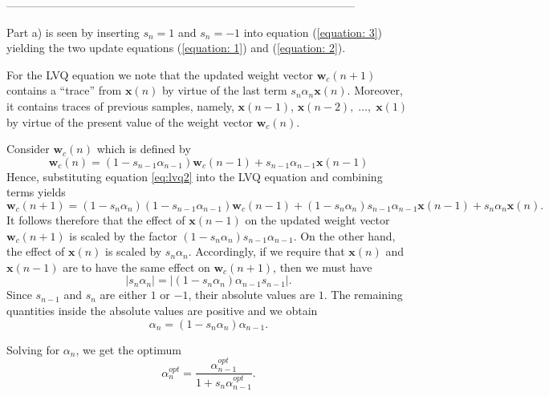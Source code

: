 \documentclass[10pt]{article}
\begin{document}
\begin{enumerate}
---------------------------------------------------------------------------------------------

Part a) is seen by inserting $s_n=1$ and $s_n=-1$ into equation (\ref{equation: 3}) yielding the two
update equations (\ref{equation: 1}) and (\ref{equation: 2}).

For the LVQ equation we note that the updated weight vector
$\mathbf{w}_c(n+1)$ contains a ``trace'' from  $\mathbf{x}(n)$ by
virtue of the last term $s_n\alpha_n\mathbf{x}(n)$. Moreover, it
contains traces of previous samples, namely, $\mathbf{x}(n-1)$,
$\mathbf{x}(n-2),\;\ldots,\; \mathbf{x}(1)$ by virtue of the present
value of the weight vector $\mathbf{w}_c(n)$.

Consider $\mathbf{w}_c(n)$ which is defined by
\begin{equation}
\mathbf{w}_c(n)=(1-s_{n-1}\alpha_{n-1})\mathbf{w}_c(n-1)+s_{n-1}\alpha_{n-1}\mathbf{x}(n-1)
\label{eq:lvq2}
\end{equation}
Hence, substituting equation \ref{eq:lvq2} into the LVQ equation and
combining terms yields
\begin{equation}
\mathbf{w}_c(n+1)=(1-s_n\alpha_n)(1-s_{n-1}\alpha_{n-1})\mathbf{w}_c(n-1)+(1-s_n\alpha_n)s_{n-1}\alpha_{n-1}\mathbf{x}(n-1)+s_n\alpha_n\mathbf{x}(n).
\label{eq:lvq3}
\end{equation}
It follows therefore that the effect of $\mathbf{x}(n-1)$ on the
updated weight vector $\mathbf{w}_c(n+1)$ is scaled by the factor
$(1-s_n\alpha_n) s_{n-1} \alpha_{n-1}$. On the other hand, the effect of
$\mathbf{x}(n)$ is scaled by $s_n\alpha_n$. Accordingly, if we require
that $\mathbf{x}(n)$ and $\mathbf{x}(n-1)$ are to have the same effect
on $\mathbf{w}_c(n+1)$, then we must have
\begin{equation*}
| s_n \alpha_n |= | (1-s_n\alpha_n)\alpha_{n-1} s_{n-1} |.
\end{equation*}
Since $s_{n-1}$ and $s_n$ are either $1$ or $-1$, their absolute values are $1$. The remaining quantities inside
the absolute values are positive and we obtain
\begin{equation*}
 \alpha_n = (1-s_n\alpha_n)\alpha_{n-1} .
\end{equation*}

Solving for $\alpha_n$, we get the optimum
\begin{equation*}
\alpha_n^{opt}=\frac{\alpha_{n-1}^{opt}}{1+s_n\alpha_{n-1}^{opt}}.
\end{equation*}






\end{enumerate}
\end{document}
